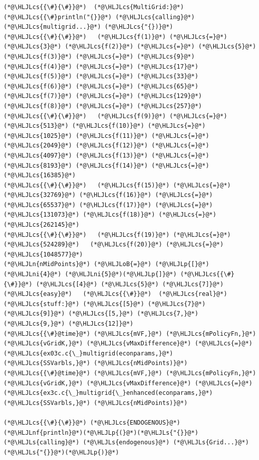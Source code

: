 \documentclass[12pt,a4paper]{article}
\newcommand{\HLJLn}[1]{#1}
\newcommand{\HLJLnf}[1]{\textcolor[RGB]{66,102,213}{#1}}
\newcommand{\HLJLs}[1]{\textcolor[RGB]{201,61,57}{#1}}
\newcommand{\HLJLni}[1]{\textcolor[RGB]{59,151,46}{#1}}
\newcommand{\HLJLoB}[1]{\textcolor[RGB]{102,102,102}{\textbf{#1}}}
\newcommand{\HLJLp}[1]{#1}
\newcommand{\HLJLcs}[1]{\textcolor[RGB]{153,153,119}{\textit{#1}}}
\begin{document}
\begin{lstlisting}
(*@\HLJLcs{{\#}{\#}}@*)  (*@\HLJLcs{MultiGrid:}@*)
(*@\HLJLcs{{\#}println("{}}@*) (*@\HLJLcs{calling}@*) (*@\HLJLcs{multigrid...}@*) (*@\HLJLcs{"{})}@*)
(*@\HLJLcs{{\#}{\#}}@*)   (*@\HLJLcs{f(1)}@*) (*@\HLJLcs{=}@*) (*@\HLJLcs{3}@*) (*@\HLJLcs{f(2)}@*) (*@\HLJLcs{=}@*) (*@\HLJLcs{5}@*) (*@\HLJLcs{f(3)}@*) (*@\HLJLcs{=}@*) (*@\HLJLcs{9}@*) (*@\HLJLcs{f(4)}@*) (*@\HLJLcs{=}@*) (*@\HLJLcs{17}@*) (*@\HLJLcs{f(5)}@*) (*@\HLJLcs{=}@*) (*@\HLJLcs{33}@*) (*@\HLJLcs{f(6)}@*) (*@\HLJLcs{=}@*) (*@\HLJLcs{65}@*) (*@\HLJLcs{f(7)}@*) (*@\HLJLcs{=}@*) (*@\HLJLcs{129}@*) (*@\HLJLcs{f(8)}@*) (*@\HLJLcs{=}@*) (*@\HLJLcs{257}@*)
(*@\HLJLcs{{\#}{\#}}@*)   (*@\HLJLcs{f(9)}@*) (*@\HLJLcs{=}@*) (*@\HLJLcs{513}@*) (*@\HLJLcs{f(10)}@*) (*@\HLJLcs{=}@*) (*@\HLJLcs{1025}@*) (*@\HLJLcs{f(11)}@*) (*@\HLJLcs{=}@*) (*@\HLJLcs{2049}@*) (*@\HLJLcs{f(12)}@*) (*@\HLJLcs{=}@*) (*@\HLJLcs{4097}@*) (*@\HLJLcs{f(13)}@*) (*@\HLJLcs{=}@*) (*@\HLJLcs{8193}@*) (*@\HLJLcs{f(14)}@*) (*@\HLJLcs{=}@*) (*@\HLJLcs{16385}@*)
(*@\HLJLcs{{\#}{\#}}@*)   (*@\HLJLcs{f(15)}@*) (*@\HLJLcs{=}@*) (*@\HLJLcs{32769}@*) (*@\HLJLcs{f(16)}@*) (*@\HLJLcs{=}@*) (*@\HLJLcs{65537}@*) (*@\HLJLcs{f(17)}@*) (*@\HLJLcs{=}@*) (*@\HLJLcs{131073}@*) (*@\HLJLcs{f(18)}@*) (*@\HLJLcs{=}@*) (*@\HLJLcs{262145}@*)
(*@\HLJLcs{{\#}{\#}}@*)   (*@\HLJLcs{f(19)}@*) (*@\HLJLcs{=}@*) (*@\HLJLcs{524289}@*)   (*@\HLJLcs{f(20)}@*) (*@\HLJLcs{=}@*) (*@\HLJLcs{1048577}@*)
(*@\HLJLn{nMidPoints}@*) (*@\HLJLoB{=}@*) (*@\HLJLp{[}@*)(*@\HLJLni{4}@*) (*@\HLJLni{5}@*)(*@\HLJLp{]}@*) (*@\HLJLcs{{\#}{\#}}@*) (*@\HLJLcs{[4}@*) (*@\HLJLcs{5}@*) (*@\HLJLcs{7]}@*) (*@\HLJLcs{easy}@*)   (*@\HLJLcs{{\#}}@*)  (*@\HLJLcs{real}@*) (*@\HLJLcs{stuff:}@*) (*@\HLJLcs{[5}@*) (*@\HLJLcs{7}@*) (*@\HLJLcs{9]}@*) (*@\HLJLcs{[5,}@*) (*@\HLJLcs{7,}@*) (*@\HLJLcs{9,}@*) (*@\HLJLcs{12]}@*)
(*@\HLJLcs{{\#}@time}@*) (*@\HLJLcs{mVF,}@*) (*@\HLJLcs{mPolicyFn,}@*) (*@\HLJLcs{vGridK,}@*) (*@\HLJLcs{vMaxDifference}@*) (*@\HLJLcs{=}@*) (*@\HLJLcs{ex03c.c{\_}multigrid(econparams,}@*) (*@\HLJLcs{SSVarbls,}@*) (*@\HLJLcs{nMidPoints)}@*)
(*@\HLJLcs{{\#}@time}@*) (*@\HLJLcs{mVF,}@*) (*@\HLJLcs{mPolicyFn,}@*) (*@\HLJLcs{vGridK,}@*) (*@\HLJLcs{vMaxDifference}@*) (*@\HLJLcs{=}@*) (*@\HLJLcs{ex3c.c{\_}multigrid{\_}enhanced(econparams,}@*) (*@\HLJLcs{SSVarbls,}@*) (*@\HLJLcs{nMidPoints)}@*)

(*@\HLJLcs{{\#}{\#}}@*) (*@\HLJLcs{ENDOGENOUS}@*)
(*@\HLJLnf{println}@*)(*@\HLJLp{(}@*)(*@\HLJLs{"{}}@*) (*@\HLJLs{calling}@*) (*@\HLJLs{endogenous}@*) (*@\HLJLs{Grid...}@*) (*@\HLJLs{"{}}@*)(*@\HLJLp{)}@*)
\end{lstlisting}
\end{document}
